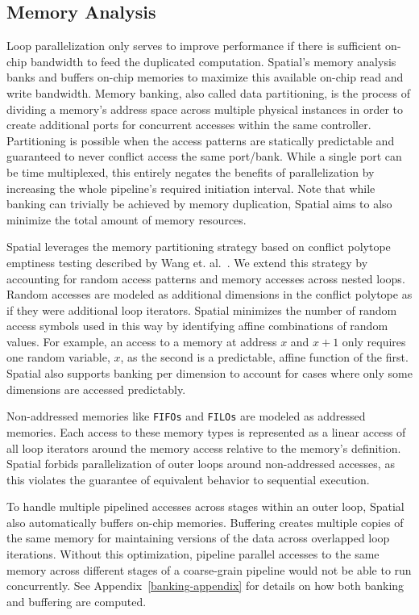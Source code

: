 {\subsection{Memory Analysis}
\label{memopts}

Loop parallelization only serves to improve performance if there is sufficient on-chip bandwidth to feed the duplicated computation.
Spatial's memory analysis banks and buffers on-chip memories to maximize this available on-chip read and write bandwidth. 
Memory banking, also called data partitioning, is the process of dividing a memory's address space across multiple physical instances in order to create
additional ports for concurrent accesses within the same controller.
Partitioning is possible when the access patterns are statically predictable and guaranteed to never conflict access the same port/bank. 
While a single port can be time multiplexed, this entirely negates the benefits of parallelization by increasing the whole pipeline's required initiation interval.
Note that while banking can trivially be achieved by memory duplication, Spatial aims to also minimize the total amount of memory resources.  

Spatial leverages the memory partitioning strategy based on conflict polytope emptiness testing described by Wang et. al.~\cite{Wang_banking}. We extend this strategy by accounting for random access patterns and memory accesses across nested loops. Random accesses are modeled as additional dimensions in the conflict polytope as if they were additional loop iterators. Spatial minimizes the number of random access symbols used in this way by identifying affine combinations of random values. For example, an access to a memory at address $x$ and $x+1$ only requires one random variable, $x$, as the second is a predictable, affine function of the first.
Spatial also supports banking per dimension to account for cases where only some dimensions are accessed predictably.

Non-addressed memories like \texttt{\small{FIFOs}} and \texttt{\small{FILOs}} are modeled as addressed memories.
Each access to these memory types is represented as a linear access of all loop iterators around the memory access relative to the memory's definition. Spatial forbids parallelization of outer loops around non-addressed accesses, as this violates the guarantee of equivalent behavior to sequential execution. 

To handle multiple pipelined accesses across stages within an outer loop, Spatial also automatically buffers on-chip memories.
Buffering creates multiple copies of the 
same memory for maintaining versions of the data across overlapped loop iterations. 
Without this optimization, pipeline parallel accesses to the same memory across different stages of a coarse-grain pipeline would not be able to run concurrently.
See Appendix~\ref{banking-appendix} for details on how both banking and buffering are computed.


}
